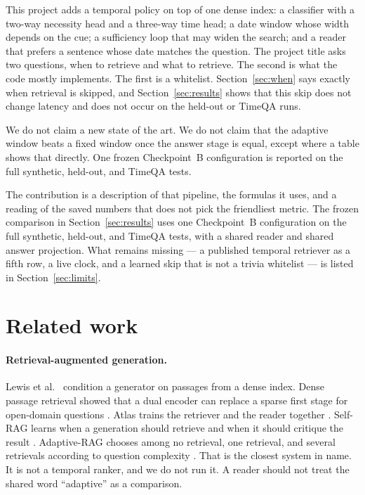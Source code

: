 \documentclass[11pt]{article}
\begin{document}
This project adds a temporal policy on top of one dense index:
a classifier with a two-way necessity head and a three-way time head;
a date window whose width depends on the cue;
a sufficiency loop that may widen the search;
and a reader that prefers a sentence whose date matches the question.
The project title asks two questions, when to retrieve and what to retrieve.
The second is what the code mostly implements.
The first is a whitelist.
Section~\ref{sec:when} says exactly when retrieval is skipped, and Section~\ref{sec:results} shows that this skip does not change latency and does not occur on the held-out or TimeQA runs.

We do not claim a new state of the art.
We do not claim that the adaptive window beats a fixed window once the answer stage is equal, except where a table shows that directly.
One frozen Checkpoint~B configuration is reported on the full synthetic, held-out, and TimeQA tests.

The contribution is a description of that pipeline, the formulas it uses, and a reading of the saved numbers that does not pick the friendliest metric.
The frozen comparison in Section~\ref{sec:results} uses one Checkpoint~B configuration on the full synthetic, held-out, and TimeQA tests, with a shared reader and shared answer projection.
What remains missing --- a published temporal retriever as a fifth row, a live clock, and a learned skip that is not a trivia whitelist --- is listed in Section~\ref{sec:limits}.

\section{Related work}
\label{sec:related}

\paragraph{Retrieval-augmented generation.}
Lewis et al.\ \cite{lewis2020rag} condition a generator on passages from a dense index.
Dense passage retrieval showed that a dual encoder can replace a sparse first stage for open-domain questions \cite{karpukhin2020dpr}.
Atlas trains the retriever and the reader together \cite{izacard2023atlas}.
Self-RAG learns when a generation should retrieve and when it should critique the result \cite{asai2024selfrag}.
Adaptive-RAG chooses among no retrieval, one retrieval, and several retrievals according to question complexity \cite{jeong2024adaptiverag}.
That is the closest system in name.
It is not a temporal ranker, and we do not run it.
A reader should not treat the shared word ``adaptive'' as a comparison.
\end{document}
